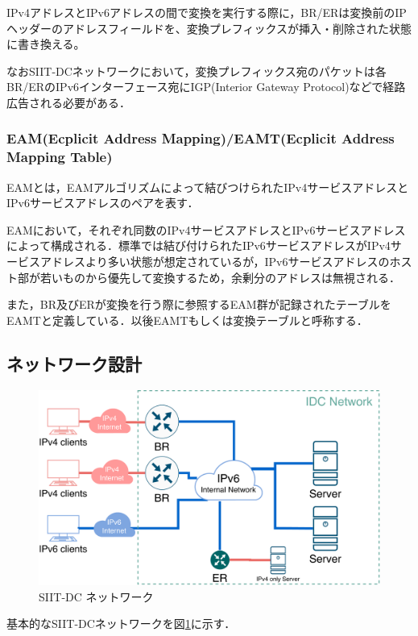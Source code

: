 IPv4アドレスとIPv6アドレスの間で変換を実行する際に，BR/ERは変換前のIPヘッダーのアドレスフィールドを、変換プレフィックスが挿入・削除された状態に書き換える。

なおSIIT-DCネットワークにおいて，変換プレフィックス宛のパケットは各BR/ERのIPv6インターフェース宛にIGP(Interior Gateway Protocol)などで経路広告される必要がある．

\subsubsection{EAM(Ecplicit Address Mapping)/EAMT(Ecplicit Address Mapping Table)}
EAMとは，EAMアルゴリズム\cite{RFC7757}によって結びつけられたIPv4サービスアドレスとIPv6サービスアドレスのペアを表す．

EAMにおいて，それぞれ同数のIPv4サービスアドレスとIPv6サービスアドレスによって構成される．標準では結び付けられたIPv6サービスアドレスがIPv4サービスアドレスより多い状態が想定されているが，IPv6サービスアドレスのホスト部が若いものから優先して変換するため，余剰分のアドレスは無視される．

また，BR及びERが変換を行う際に参照するEAM群が記録されたテーブルをEAMTと定義している．以後EAMTもしくは変換テーブルと呼称する．



\subsection{ネットワーク設計}
\label{issue:siit-dc:network}
\begin{figure}[h]
    \begin{center}
      \includegraphics[width=12cm,pagebox=cropbox,clip]{img/siit-dc-network.pdf}
    \end{center}
    \caption{SIIT-DC ネットワーク}
    \label{fig:siit-dc_network}
\end{figure}
基本的なSIIT-DCネットワークを図\ref{fig:siit-dc_network}に示す．

